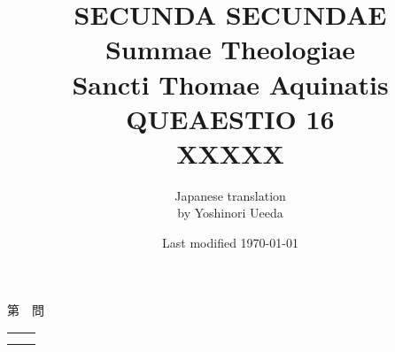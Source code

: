\documentclass[10pt]{jsarticle} %
\title{{\bf SECUNDA SECUNDAE}\\{\HUGE Summae Theologiae}\\Sancti Thomae
Aquinatis\\{\sffamily QUEAESTIO 16}\\XXXXX}
\author{Japanese translation\\by Yoshinori {\sc Ueeda}}
\date{Last modified \today}
\begin{document}
\maketitle
\pagestyle{fancy}

\begin{center}
{\Large 第　問\\}
\end{center}

\begin{longtable}{p{21em}p{21em}}


&



\\

&


\end{longtable}

\newpage
\end{document}
